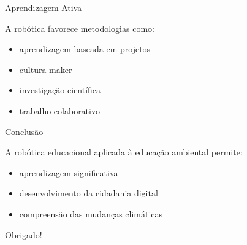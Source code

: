 \documentclass{beamer}
\begin{document}
\begin{frame}{Aprendizagem Ativa}

A robótica favorece metodologias como:

\begin{itemize}
\item aprendizagem baseada em projetos
\item cultura maker
\item investigação científica
\item trabalho colaborativo
\end{itemize}

\bigskip

\centering
{}

\end{frame}

\begin{frame}{Conclusão}

A robótica educacional aplicada à educação ambiental permite:

\begin{itemize}
\item aprendizagem significativa
\item desenvolvimento da cidadania digital
\item compreensão das mudanças climáticas
\end{itemize}

\bigskip

\centering
{}

\end{frame}

\begin{frame}
\centering
\Huge Obrigado!
\end{frame}
\end{document}
